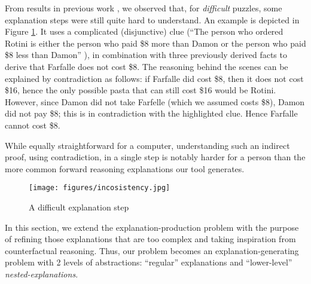 From results in previous work \cite{ecai/BogaertsGCG20}, we observed that, for \textit{difficult} puzzles, some explanation steps were still quite hard to understand.
An example is depicted in Figure \ref{fig:pasta_diff}.
It uses a complicated (disjunctive) clue (``The person who ordered Rotini is either the person who paid \$8 more than Damon or the person who paid \$8 less than Damon'' ), in combination with three previously derived facts to derive that Farfalle does not cost \$8.
The reasoning behind the scenes can be explained by contradiction as follows: if Farfalle did cost \$8, then it does not cost \$16, hence the only possible pasta that can still cost \$16 would be Rotini.
However, since Damon did not take Farfelle (which we assumed costs \$8), Damon did not pay \$8; this is in contradiction with the highlighted clue. Hence Farfalle cannot cost \$8.

While equally straightforward for a computer, understanding such an indirect proof, using contradiction, in a single step is notably harder for a person than the more common forward reasoning explanations our tool generates.
\begin{figure}[t!]
    \texttt{[image: figures/incosistency.jpg]}
    \caption{A difficult explanation step}\label{fig:pasta_diff}
\end{figure}

In this section, we extend the explanation-production problem with the purpose of refining those explanations that are too complex and taking inspiration from counterfactual reasoning.
Thus, our problem becomes an explanation-generating problem with 2 levels of abstractions: ``regular'' explanations and ``lower-level'' \textit{nested-explanations}.




